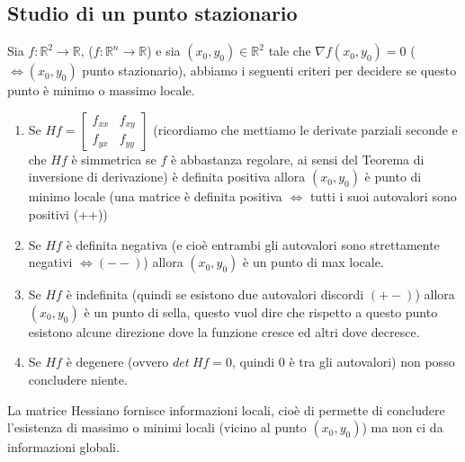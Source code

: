 \subsection{Studio di un punto stazionario}
Sia $f: \mathbb{R}^2 \to \mathbb{R}$, ($f: \mathbb{R}^n \to \mathbb{R}$) e sia $(x_0, y_0) \in \mathbb{R}^2$ tale che $\nabla f(x_0, y_0) = 0$ ($\Longleftrightarrow (x_0, y_0)$ punto stazionario), abbiamo i seguenti criteri per decidere se questo punto è minimo o massimo locale.
\begin{enumerate}
    \item Se $Hf = \begin{bmatrix}f_{xx} & f_{xy} \\ f_{yx} & f_{yy}\end{bmatrix}$ (ricordiamo che mettiamo le derivate parziali seconde e che $Hf$ è simmetrica se $f$ è abbastanza regolare, ai sensi del Teorema di inversione di derivazione) è definita positiva allora $(x_0, y_0)$ è punto di minimo locale (una matrice è definita positiva $\Longleftrightarrow$ tutti i suoi autovalori sono positivi (++))
    \item Se $Hf$ è definita negativa (e cioè entrambi gli autovalori sono strettamente negativi $\Longleftrightarrow (--)$) allora $(x_0, y_0)$ è un punto di max locale.
    \item Se $Hf$ è indefinita (quindi se esistono due autovalori discordi $(+-)$) allora $(x_0, y_0)$ è un punto di sella, questo vuol dire che rispetto a questo punto esistono alcune direzione dove la funzione cresce ed altri dove decresce.
    \item Se $Hf$ è degenere (ovvero $det\: Hf = 0$, quindi 0 è tra gli autovalori) non posso concludere niente.
\end{enumerate}

\begin{observation}
La matrice Hessiano fornisce informazioni locali, cioè di permette di concludere l'esistenza di massimo o minimi locali (vicino al punto $(x_0,y_0)$) ma non ci da informazioni globali.
\end{observation}

